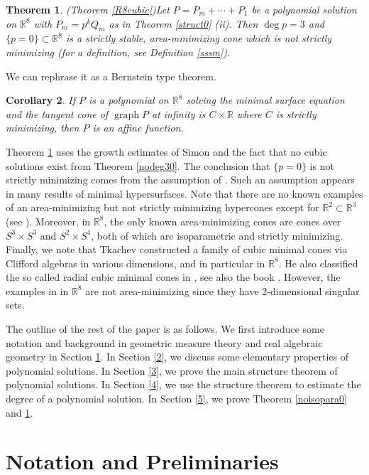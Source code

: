 \documentclass[pdflatex,sn-mathphys-num]{sn-jnl}%
\theoremstyle{thmstyleone}%
\newtheorem{theorem}{Theorem}[section]%
\newtheorem{corollary}[theorem]{Corollary}
\theoremstyle{thmstyletwo}%
\theoremstyle{thmstylethree}%
\newcommand{\R}{\mathbb{R}}
\DeclareMathOperator{\graph}{graph}
\begin{document}
\begin{theorem}(Theorem \ref{R8cubic})\label{R8cubic0}
	Let $P=P_m+\cdots+P_1$ be a polynomial solution on $\R^8$ with $P_m=p^kQ_m$ as in Theorem \ref{struct0} (ii). Then $\deg p=3$ and $\{p=0\}\subset \R^8$ is a strictly stable, area-minimizing cone which is not strictly minimizing (for a definition, see Definition \ref{sssm}).
\end{theorem}
We can rephrase it as a Bernstein type theorem.
\begin{corollary}\label{R8}
	If $P$ is a polynomial on $\R^8$ solving the minimal surface equation and the tangent cone of $\graph P$ at infinity is $C\times\R$ where $C$ is strictly minimizing, then $P$ is an affine function.
\end{corollary}
Theorem \ref{R8cubic0} uses the growth estimates of Simon \cite{simon1989entire} and the fact that no cubic solutions exist from Theorem \ref{nodeg30}. The conclusion that $\{p=0\}$ is not strictly minimizing comes from the assumption of \cite{simon1989entire}. Such an assumption appears in many results of minimal hypersurfaces. Note that there are no known examples of an area-minimizing but not strictly minimizing hypercones except for $\R^2\subset \R^3$ (see \cite{lin_1987}). Moreover, in $\R^8$, the only known area-minimizing cones are cones over $S^3\times S^3$ and $S^2\times S^4$, both of which are isoparametric and strictly minimizing. Finally, we note that Tkachev \cite{TkClifford} constructed a family of cubic minimal cones via Clifford algebras in various dimensions, and in particular in $\R^8$. He also classified the so called radial cubic minimal cones in \cite{tkachev2010classification}, see also the book \cite[Chapter 6]{NTV}. However, the examples in \cite{TkClifford} in $\R^8$ are not area-minimizing since they have 2-dimensional singular sets.


The outline of the rest of the paper is as follows. We first introduce some notation and background in geometric measure theory and real algebraic geometry in Section \ref{notations}. In Section \ref{2}, we discuss some elementary properties of polynomial solutions. In Section \ref{3}, we prove the main structure theorem of polynomial solutions.  In Section \ref{4}, we use the structure theorem to estimate the degree of a polynomial solution. In Section \ref{5}, we prove Theorem \ref{noisopara0} and \ref{R8cubic0}.

\section{Notation and Preliminaries}
\label{notations}
\end{document}
